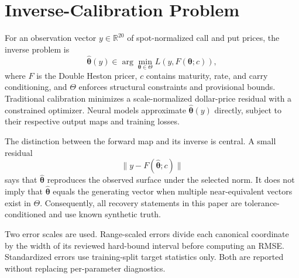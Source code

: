 \section{Inverse-Calibration Problem}
\label{sec:inverse-problem}

For an observation vector $y\in\mathbb{R}^{20}$ of spot-normalized call and put
prices, the inverse problem is
\begin{equation}
    \hat{\bm{\theta}}(y)
    \in \arg\min_{\bm{\theta}\in\Theta}
    L\!\left(y, F(\bm{\theta};c)\right),
    \label{eq:inverse-calibration}
\end{equation}
where $F$ is the Double Heston pricer, $c$ contains maturity, rate, and carry
conditioning, and $\Theta$ enforces structural constraints and provisional bounds.
Traditional calibration minimizes a scale-normalized dollar-price residual with a
constrained optimizer. Neural models approximate $\hat{\bm{\theta}}(y)$ directly,
subject to their respective output maps and training losses.

The distinction between the forward map and its inverse is central. A small residual
\[
    \|y-F(\hat{\bm{\theta}};c)\|
\]
says that $\hat{\bm{\theta}}$ reproduces the observed surface under the selected norm.
It does not imply that $\hat{\bm{\theta}}$ equals the generating vector when multiple
near-equivalent vectors exist in $\Theta$. Consequently, all recovery statements in
this paper are tolerance-conditioned and use known synthetic truth.

Two error scales are used. Range-scaled errors divide each canonical coordinate by
the width of its reviewed hard-bound interval before computing an RMSE. Standardized
errors use training-split target statistics only. Both are reported without replacing
per-parameter diagnostics.
